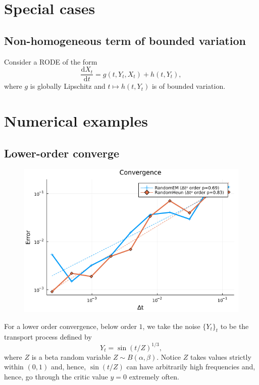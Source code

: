 \documentclass[reqno,12pt]{amsart}
\theoremstyle{plain}%
\theoremstyle{definition}
\begin{document}
\section{Special cases}

\subsection{Non-homogeneous term of bounded variation}

Consider a RODE of the form
\[
\frac{\mathrm{d}X_t}{\mathrm{d}t} = g(t, Y_t, X_t) + h(t, Y_t),    
\]
where $g$ is globally Lipschitz and $t \mapsto h(t, Y_t)$ is of bounded variation.

\section{Numerical examples}

\subsection{Lower-order converge}

\begin{figure}
  \includegraphics[scale=0.8]{img/plot_13.png}
\end{figure}

For a lower order convergence, below order $1$, we take the noise $\{Y_t\}_t$ to be the transport process defined by
$$
Y_t = \sin(t/Z)^{1/3},
$$
where $Z$ is a beta random variable $Z \sim B(\alpha, \beta)$. Notice $Z$ takes values strictly within $(0, 1)$ and, hence, $\sin(t/Z)$ can have arbitrarily high frequencies and, hence, go through the critic value $y = 0$ extremely often.
\end{document}
